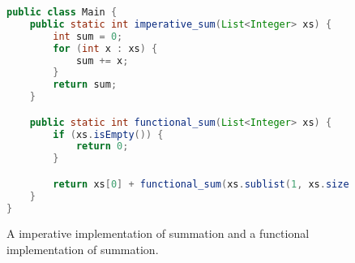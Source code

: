 \begin{figure}[htb]
    \centering
    \begin{lstlisting}[language=Java]
public class Main {
    public static int imperative_sum(List<Integer> xs) {
        int sum = 0;
        for (int x : xs) {
            sum += x;
        }
        return sum;
    }

    public static int functional_sum(List<Integer> xs) {
        if (xs.isEmpty()) {
            return 0;
        }

        return xs[0] + functional_sum(xs.sublist(1, xs.size()));
    }
}
\end{lstlisting}
    \caption{A imperative implementation of summation and a functional implementation of summation.}
    \label{fig:imperative_vs_functional_example}
\end{figure}
